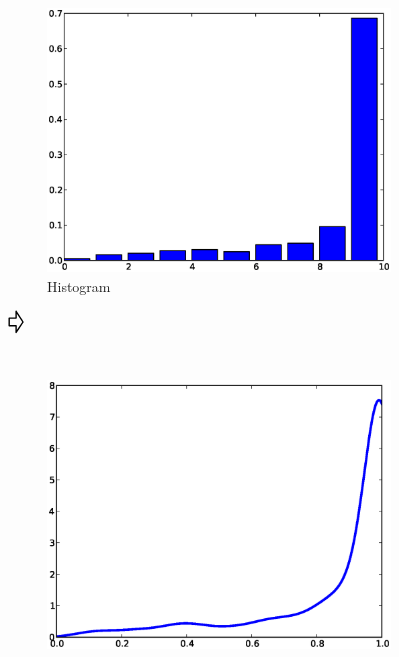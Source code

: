 \begin{figure}[htp]
        \centering
        \begin{subfigure}[c]{0.3\textwidth}
                \includegraphics[width=\textwidth]{images/hist1}
                \caption{Histogram}
                \label{fig:clf-discretisation-1}
        \end{subfigure}%
        $\vcenter{\hbox{\raisebox{.8cm}{\Huge\pointer}}}$
        \begin{subfigure}[c]{0.3\textwidth}
                \includegraphics[width=\textwidth]{images/hist2}

\end{subfigure}
\end{figure}
